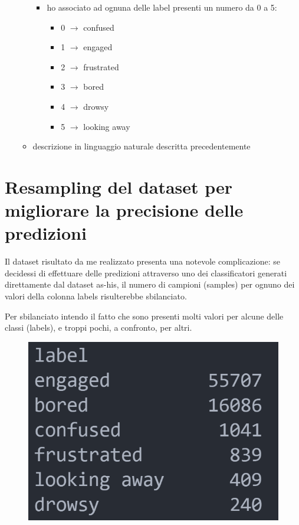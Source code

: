 \begin{itemize}
\begin{itemize}
\begin{itemize}
            \item ho associato ad ognuna delle label presenti un numero da 0 a 5:
            \begin{itemize}
                \item 0 $\rightarrow$ confused
                \item 1 $\rightarrow$ engaged
                \item 2 $\rightarrow$ frustrated
                \item 3 $\rightarrow$ bored
                \item 4 $\rightarrow$ drowsy
                \item 5 $\rightarrow$ looking away
            \end{itemize}
        \end{itemize}
        \item descrizione in linguaggio naturale descritta precedentemente
    \end{itemize}
\end{itemize}

\section{Resampling del dataset per migliorare la precisione delle predizioni} 
Il dataset risultato da me realizzato presenta una notevole complicazione: se decidessi di effettuare delle predizioni attraverso uno dei classificatori generati direttamente dal dataset as-his, il numero di campioni (samples) per ognuno dei valori della colonna labels risulterebbe sbilanciato.

Per sbilanciato intendo il fatto che sono presenti molti valori per alcune delle classi (labels), e troppi pochi, a confronto, per altri.
\begin{figure}
    \begin{center}    
        \includegraphics[width=0.4\linewidth]{images/image42.png}
    \end{center}
\end{figure}

